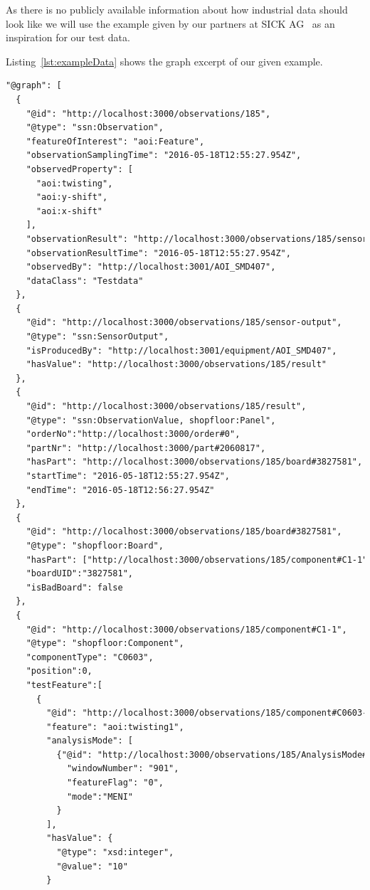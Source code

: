 As there is no publicly available information about how industrial data should look like we will use the example given by our partners at SICK AG~\cite{SICK} as an inspiration for our test data.

Listing~\ref{lst:exampleData} shows the graph excerpt of our given example.

\begin{lstlisting}[language={XML},label={lst:exampleData},caption={An excerpt showing the observation of components.}]
"@graph": [
  {
    "@id": "http://localhost:3000/observations/185",
    "@type": "ssn:Observation",
    "featureOfInterest": "aoi:Feature",
    "observationSamplingTime": "2016-05-18T12:55:27.954Z",
    "observedProperty": [
      "aoi:twisting",
      "aoi:y-shift",
      "aoi:x-shift"
    ],
    "observationResult": "http://localhost:3000/observations/185/sensor-output",
    "observationResultTime": "2016-05-18T12:55:27.954Z",
    "observedBy": "http://localhost:3001/AOI_SMD407",
    "dataClass": "Testdata"
  },
  {
    "@id": "http://localhost:3000/observations/185/sensor-output",
    "@type": "ssn:SensorOutput",
    "isProducedBy": "http://localhost:3001/equipment/AOI_SMD407",
    "hasValue": "http://localhost:3000/observations/185/result"
  },
  {
    "@id": "http://localhost:3000/observations/185/result",
    "@type": "ssn:ObservationValue, shopfloor:Panel",
    "orderNo":"http://localhost:3000/order#0",
    "partNr": "http://localhost:3000/part#2060817",
    "hasPart": "http://localhost:3000/observations/185/board#3827581",
    "startTime": "2016-05-18T12:55:27.954Z",
    "endTime": "2016-05-18T12:56:27.954Z"
  },
  {
    "@id": "http://localhost:3000/observations/185/board#3827581",
    "@type": "shopfloor:Board",
    "hasPart": ["http://localhost:3000/observations/185/component#C1-1","http://localhost:3000/observations/185/component#C2-1"],
    "boardUID":"3827581",
    "isBadBoard": false
  },
  {
    "@id": "http://localhost:3000/observations/185/component#C1-1",
    "@type": "shopfloor:Component",
    "componentType": "C0603",
    "position":0,
    "testFeature":[
      {
        "@id": "http://localhost:3000/observations/185/component#C0603-MENI-901-TWISTING",
        "feature": "aoi:twisting1",
        "analysisMode": [
          {"@id": "http://localhost:3000/observations/185/AnalysisMode#C0603-MENI-901-TWISTING",
            "windowNumber": "901",
            "featureFlag": "0",
            "mode":"MENI"
          }
        ],
        "hasValue": {
          "@type": "xsd:integer",
          "@value": "10"
        }


\end{lstlisting}
